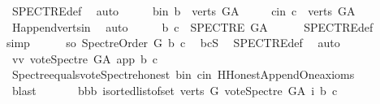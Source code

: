\begin{isabellebody}
\ SPECTRE{\isacharunderscore}{\kern0pt}def\ \isamarkupfalse%
\ auto\isanewline
\ \ \isamarkupfalse%
\ \isamarkupfalse%
\ b{\isacharunderscore}{\kern0pt}in{}{\isacharcolon}{\kern0pt}\ {\isachardoublequoteopen}b\ {\isasymin}\ verts\ G{\isacharunderscore}{\kern0pt}A{\isachardoublequoteclose}\isanewline
\ \ \ \ \ c{\isacharunderscore}{\kern0pt}in{}{\isacharcolon}{\kern0pt}\ {\isachardoublequoteopen}c\ {\isasymin}\ verts\ G{\isacharunderscore}{\kern0pt}A{\isachardoublequoteclose}\ \isamarkupfalse%
\ H{}{\isachardot}{\kern0pt}append{\isacharunderscore}{\kern0pt}verts{\isacharunderscore}{\kern0pt}in\ \isamarkupfalse%
\ auto\isanewline
\ \ \isamarkupfalse%
\ \isamarkupfalse%
\ {\isachardoublequoteopen}{\isacharparenleft}{\kern0pt}b{\isacharcomma}{\kern0pt}\ c{\isacharparenright}{\kern0pt}\ {\isasymin}\ SPECTRE\ G{\isacharunderscore}{\kern0pt}A{\isachardoublequoteclose}\isanewline
\ \ \ \ \isamarkupfalse%
\ SPECTRE{\isacharunderscore}{\kern0pt}def\ \isanewline
\ \ \isamarkupfalse%
{\isacharparenleft}{\kern0pt}simp{\isacharparenright}{\kern0pt}\isanewline
\ \ \ \ \isamarkupfalse%
\ so{\isacharcolon}{\kern0pt}\ {\isachardoublequoteopen}Spectre{\isacharunderscore}{\kern0pt}Order\ G\ b\ c{\isachardoublequoteclose}\ \isamarkupfalse%
\ bcS\ \isamarkupfalse%
\ SPECTRE{\isacharunderscore}{\kern0pt}def\ \isamarkupfalse%
\ auto\isanewline
\ \ \ \ \isamarkupfalse%
\ \isamarkupfalse%
\ vv{\isacharcolon}{\kern0pt}\ {\isachardoublequoteopen}vote{\isacharunderscore}{\kern0pt}Spectre\ G{\isacharunderscore}{\kern0pt}A\ app\ b\ c\ {\isacharequal}{\kern0pt}\ {}{\isachardoublequoteclose}\isanewline
\ \ \ \ \ \ \isamarkupfalse%
\ Spectre{\isacharunderscore}{\kern0pt}equals{\isacharunderscore}{\kern0pt}vote{\isacharunderscore}{\kern0pt}Spectre{\isacharunderscore}{\kern0pt}honest\ b{\isacharunderscore}{\kern0pt}in\ c{\isacharunderscore}{\kern0pt}in\ H{}{\isachardot}{\kern0pt}Honest{\isacharunderscore}{\kern0pt}Append{\isacharunderscore}{\kern0pt}One{\isacharunderscore}{\kern0pt}axioms\isanewline
\ \ \ \ \ \ \isamarkupfalse%
\ blast\ \isanewline
\ \ \ \ \isamarkupfalse%
\ bbb{\isacharcolon}{\kern0pt}\ {\isachardoublequoteopen}{\isacharparenleft}{\kern0pt}{\isasymSum}i{\isasymleftarrow}sorted{\isacharunderscore}{\kern0pt}list{\isacharunderscore}{\kern0pt}of{\isacharunderscore}{\kern0pt}set\ {\isacharparenleft}{\kern0pt}verts\ G{\isacharparenright}{\kern0pt}{\isachardot}{\kern0pt}\ vote{\isacharunderscore}{\kern0pt}Spectre\ G{\isacharunderscore}{\kern0pt}A\ i\ b\ c{\isacharparenright}{\kern0pt}\ {\isacharequal}{\kern0pt}\isanewline

\end{isabellebody}
